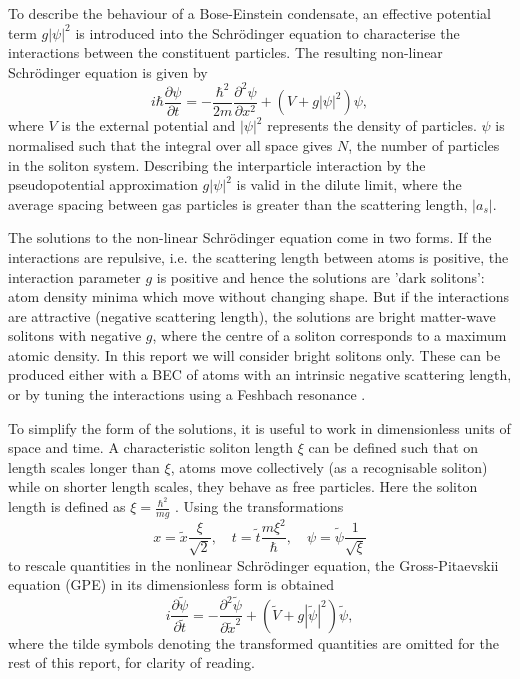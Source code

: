 \documentclass[10pt, twocolumn]{revtex4}    %
\begin{document}
To describe the behaviour of a Bose-Einstein condensate, an effective potential term $g |\psi|^2$  is introduced into the Schr\"{o}dinger equation to characterise the interactions between the constituent particles. The resulting non-linear Schr\"{o}dinger equation is given by 
\begin{equation} \label{NLSE}
i \hbar \frac{\partial \psi}{\partial t} = -\frac{\hbar^2}{2m} \frac{\partial^2 \psi}{\partial x^2} + (V+g |\psi|^2) \psi,
\end{equation}
where $V$ is the external potential and $|\psi|^2$ represents the density of particles. $\psi$ is normalised such that the integral over all space gives $N$, the number of particles in the soliton system. Describing the interparticle interaction by the pseudopotential approximation $g |\psi|^2$ is valid in the dilute limit, where the average spacing between gas particles is greater than the scattering length, $|a_s|$. 

The solutions to the non-linear Schr\"{o}dinger equation come in two forms. If the interactions are repulsive, i.e. the scattering length between atoms is positive, the interaction parameter $g$ is positive and hence the solutions are 'dark solitons': atom density minima which move without changing shape. But if the interactions are attractive (negative scattering length), the solutions are bright matter-wave solitons with negative $g$, where the centre of a soliton corresponds to a maximum atomic density. In this report we will consider bright solitons only. These can be produced either with a BEC of atoms with an intrinsic negative scattering length, or by tuning the interactions using a Feshbach resonance \cite{Feshbach}. 

To simplify the form of the solutions, it is useful to work in dimensionless units of space and time. A characteristic soliton length $\xi$ can be defined such that on length scales longer than $\xi$, atoms move collectively (as a recognisable soliton) while on shorter length scales, they behave as free particles. Here the soliton length is defined as $\xi = \frac{\hbar^2}{mg}$ \cite{Cornish}. Using the transformations \cite{Transforms} 
\begin{equation} \label{transforms}
x = \tilde{x} \frac{\xi}{\sqrt{2}}, \quad		 t = \tilde{t} \frac{m \xi^2}{\hbar}, 	\quad \psi = \tilde{\psi} \frac{1}{\sqrt{\xi}}
\end{equation}
to rescale quantities in the nonlinear Schr\"{o}dinger equation, the Gross-Pitaevskii equation (GPE) in its dimensionless form is obtained \cite{Gross} \cite{Pitaevskii}
\begin{equation} \label{GPE}
i \frac{\partial \tilde{\psi}}{\partial \tilde{t}} = -\frac{\partial^2 \tilde{\psi}}{\partial \tilde{x}^2} + (\tilde{V}+g |\tilde{\psi}|^2) \tilde{\psi},
\end{equation}
where the tilde symbols denoting the transformed quantities are omitted for the rest of this report, for clarity of reading. 
\end{document}
